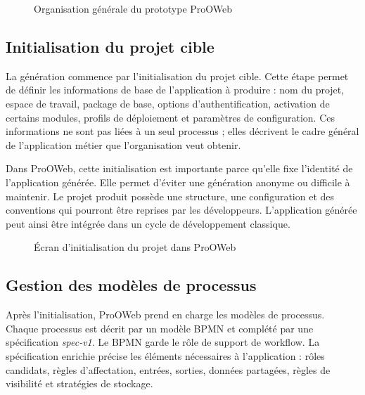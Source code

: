 \begin{figure}[H]
\centering
{}
\caption{Organisation générale du prototype ProOWeb}
\label{fig:chap4-organisation-prototype}
\end{figure}

\label{sec:chap4-implementation-generation}

\subsection{Initialisation du projet cible}

La génération commence par l'initialisation du projet cible. Cette étape permet de définir les informations de base de l'application à produire : nom du projet, espace de travail, package de base, options d'authentification, activation de certains modules, profils de déploiement et paramètres de configuration. Ces informations ne sont pas liées à un seul processus ; elles décrivent le cadre général de l'application métier que l'organisation veut obtenir.

Dans ProOWeb, cette initialisation est importante parce qu'elle fixe l'identité de l'application générée. Elle permet d'éviter une génération anonyme ou difficile à maintenir. Le projet produit possède une structure, une configuration et des conventions qui pourront être reprises par les développeurs. L'application générée peut ainsi être intégrée dans un cycle de développement classique.

\begin{figure}[H]
\centering
{}
\caption{Écran d'initialisation du projet dans ProOWeb}
\label{fig:chap4-initialisation-projet}
\end{figure}

\subsection{Gestion des modèles de processus}

Après l'initialisation, ProOWeb prend en charge les modèles de processus. Chaque processus est décrit par un modèle BPMN et complété par une spécification \textit{spec-v1}. Le BPMN garde le rôle de support de workflow. La spécification enrichie précise les éléments nécessaires à l'application : rôles candidats, règles d'affectation, entrées, sorties, données partagées, règles de visibilité et stratégies de stockage.

